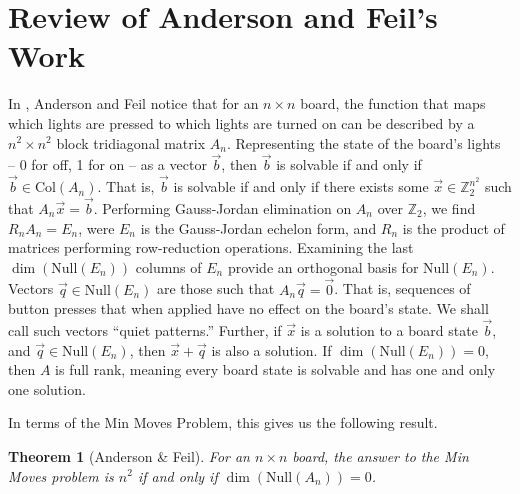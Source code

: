 \documentclass[a4paper]{article}
\newtheorem{theorem}{Theorem}
\newcommand{\Z}{\mathbb{Z}}
\begin{document}
	\section{Review of Anderson and Feil's Work}
	In \cite{anderson_feil}, Anderson and Feil notice that for an $n \times n$ board, the function that maps which lights are pressed to which lights are turned on can be described by a $n^2 \times n^2$ block tridiagonal matrix $A_n$.
	Representing the state of the board's lights -- 0 for off, 1 for on -- as a vector $\vec{b}$, then $\vec{b}$ is solvable if and only if $\vec{b} \in \text{Col}(A_n)$.
	That is, $\vec{b}$ is solvable if and only if there exists some $\vec{x} \in \Z^{n^2}_2$ such that $A_n\vec{x} = \vec{b}$.
	Performing Gauss-Jordan elimination on $A_n$ over $\Z_2$, we find $R_nA_n = E_n$, were $E_n$ is the Gauss-Jordan echelon form, and $R_n$ is the product of matrices performing row-reduction operations.
	Examining the last $\dim(\text{Null}(E_n))$ columns of $E_n$ provide an orthogonal basis for $\text{Null}(E_n)$.
	Vectors $\vec{q} \in \text{Null}(E_n)$ are those such that $A_n\vec{q} = \vec{0}$.
	That is, sequences of button presses that when applied have no effect on the board's state.
	We shall call such vectors ``quiet patterns.''
	Further, if $\vec{x}$ is a solution to a board state $\vec{b}$, and $\vec{q} \in \text{Null}(E_n)$, then $\vec{x} + \vec{q}$ is also a solution.
	If $\dim(\text{Null}(E_n)) = 0$, then $A$ is full rank, meaning every board state is solvable and has one and only one solution.
	
	In terms of the Min Moves Problem, this gives us the following result.
	\begin{theorem}[Anderson \& Feil]\label{ansderson-feil-trivial-n2}
		For an $n \times n$ board, the answer to the Min Moves problem is $n^2$ if and only if $\dim(\text{Null}(A_n)) = 0$.
	\end{theorem}
		
\end{document}
